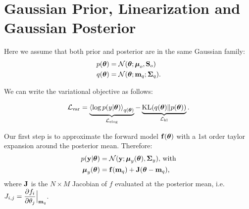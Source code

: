 \section{Gaussian Prior, Linearization and Gaussian Posterior}
Here we assume that both prior and posterior are in the same Gaussian family:
\begin{align}
	p(\boldsymbol{ \theta }) &= \mathcal{N}(\boldsymbol{ \theta }; \boldsymbol{ \mu }_{o}, \mathbf{S}_{o}) \\
	q(\boldsymbol{ \theta }) &= \mathcal{N}(\boldsymbol{ \theta }; \mathbf{m}_{q}; \mathbf{\Sigma}_{q}) \text{.}
\end{align}

We can write the variational objective as follows:

\begin{align}
\label{eq:lvar}
\mathcal{L}_{\text{var}} 	 = \underbrace{\left\langle \log p(y | \boldsymbol{ \theta }) \right\rangle_{q(\boldsymbol{ \theta })}}_{\mathcal{L}_{\text{{elog}}}} -\underbrace{\mathrm{KL}(q(\boldsymbol{ \theta }) \lVert p(\boldsymbol{ \theta }))}_{\mathcal{L}_{\text{{kl}}}} \text{.}
\end{align}

Our first step is to approximate the forward model $\mathbf{f}(\boldsymbol{ \theta })$ with a 1st order taylor expansion around the posterior mean. Therefore:
\begin{align}
	p(\mathbf{y} | \boldsymbol{ \theta }) &= \mathcal{N}(\mathbf{y}; \boldsymbol{ \mu }_{y}(\boldsymbol{ \theta }), \mathbf{\Sigma}_{y}) \text{, with} \\
	 	\boldsymbol{ \mu }_{y}(\boldsymbol{ \theta }) & = \mathbf{f}(\mathbf{m}_{q}) + \mathbf{J}(\boldsymbol{ \theta } -\mathbf{m}_{q}) \text{, } 
\end{align}
where $\mathbf{J}$
is the $N \times M$ Jacobian of $f$ evaluated at the posterior mean,
i.e. $
\displaystyle
J_{i,j} = \frac{\partial{f_{i}}}{\partial{\theta_{j}}} \Big|_{\mathbf{m}_{q}}
$.

